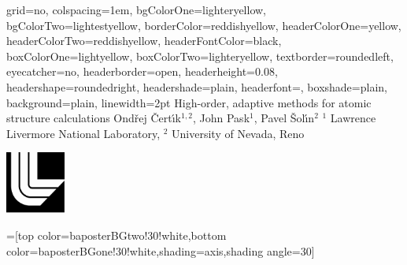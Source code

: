 \documentclass[landscape,final]{baposter}
\begin{document}
\begin{poster}{
  grid=no,
  colspacing=1em,
  bgColorOne=lighteryellow,
  bgColorTwo=lightestyellow,
  borderColor=reddishyellow,
  headerColorOne=yellow,
  headerColorTwo=reddishyellow,
  headerFontColor=black,
  boxColorOne=lightyellow,
  boxColorTwo=lighteryellow,
  textborder=roundedleft,
  eyecatcher=no,
  headerborder=open,
  headerheight=0.08\textheight,
  headershape=roundedright,
  headershade=plain,
  headerfont=\Large\textsf, %
  boxshade=plain,
  background=plain,
  linewidth=2pt
  }
  {} %
  {\sf %
  High-order, adaptive methods for atomic structure calculations}
  {\sf %
  Ond\v rej \v Cert\'\i k$^{1,2}$, John Pask$^1$, Pavel \v Sol\'\i n$^2$
  \hspace{3em}$^1$ Lawrence Livermore National Laboratory,
  $^2$ University of Nevada, Reno
  }
  {{\begin{minipage}{16em}
    \hfill
    \includegraphics[height=5.5em]{llnl_logo}
  \end{minipage}}
  }

  =[top color=baposterBGtwo!30!white,bottom color=baposterBGone!30!white,shading=axis,shading angle=30]

     \newlength{\leftimgwidth}
     \setlength{\leftimgwidth}{0.78em+8.0em}

    \newcommand{\colouredcircle}[1]{%
      \tikz{\useasboundingbox (-0.2em,-0.32em) rectangle(0.2em,0.32em); \draw[draw=black,fill=baposterBGone!80!black!#1!white,line width=0.03em] (0,0) circle(0.18em);}}


\end{poster}
\end{document}
